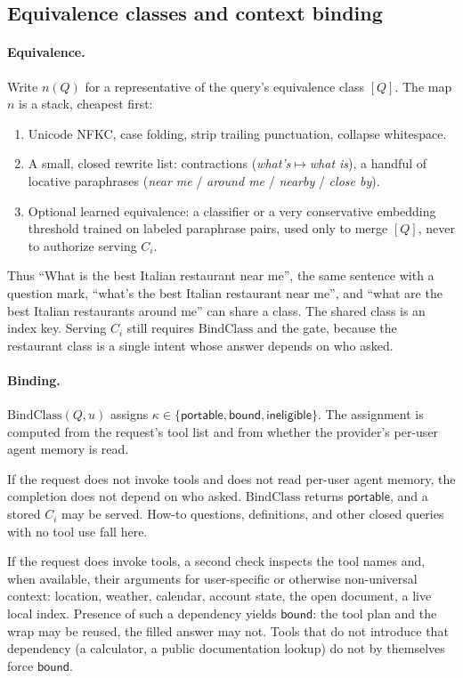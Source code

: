 \subsection{Equivalence classes and context binding}
\label{sec:method-bind}

\paragraph{Equivalence.}
Write $n(Q)$ for a representative of the query's equivalence class $[Q]$. The map $n$ is a stack, cheapest first:
\begin{enumerate}
  \item Unicode NFKC, case folding, strip trailing punctuation, collapse whitespace.
  \item A small, closed rewrite list: contractions (\emph{what's}$\mapsto$\emph{what is}), a handful of locative paraphrases (\emph{near me} / \emph{around me} / \emph{nearby} / \emph{close by}).
  \item Optional learned equivalence: a classifier or a very conservative embedding threshold trained on labeled paraphrase pairs, used only to merge $[Q]$, never to authorize serving $C_i$.
\end{enumerate}
Thus ``What is the best Italian restaurant near me'', the same sentence with a question mark, ``what's the best Italian restaurant near me'', and ``what are the best Italian restaurants around me'' can share a class. The shared class is an index key. Serving $C_i$ still requires $\mathrm{BindClass}$ and the gate, because the restaurant class is a single intent whose answer depends on who asked.

\paragraph{Binding.}
$\mathrm{BindClass}(Q,u)$ assigns $\kappa\in\{\mathsf{portable},\mathsf{bound},\mathsf{ineligible}\}$. The assignment is computed from the request's tool list and from whether the provider's per-user agent memory is read.

If the request does not invoke tools and does not read per-user agent memory, the completion does not depend on who asked. $\mathrm{BindClass}$ returns $\mathsf{portable}$, and a stored $C_i$ may be served. How-to questions, definitions, and other closed queries with no tool use fall here.

If the request does invoke tools, a second check inspects the tool names and, when available, their arguments for user-specific or otherwise non-universal context: location, weather, calendar, account state, the open document, a live local index. Presence of such a dependency yields $\mathsf{bound}$: the tool plan and the wrap may be reused, the filled answer may not. Tools that do not introduce that dependency (a calculator, a public documentation lookup) do not by themselves force $\mathsf{bound}$.

